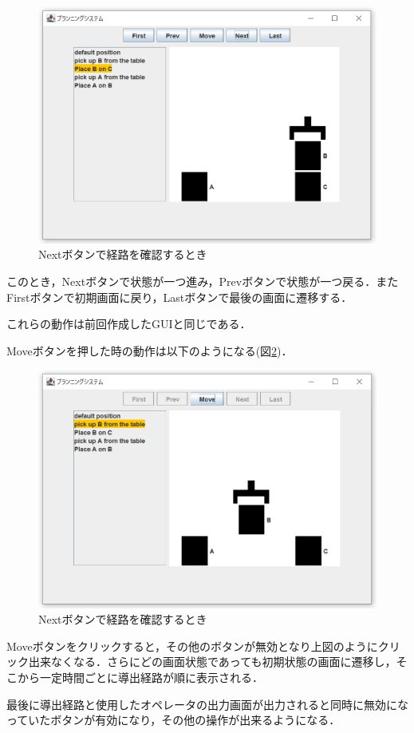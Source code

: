 \documentclass[12pt]{jarticle}
\begin{document}
\begin{figure}[htbp]
  \begin{center}
    \includegraphics[scale=0.8]{images/Normal.PNG}
    \caption{Nextボタンで経路を確認するとき}
    \label{fig:Normal}
  \end{center}
\end{figure}
このとき，Nextボタンで状態が一つ進み，Prevボタンで状態が一つ戻る．またFirstボタンで初期画面に戻り，Lastボタンで最後の画面に遷移する．\par
これらの動作は前回作成したGUIと同じである．\\

\clearpage

Moveボタンを押した時の動作は以下のようになる(図\ref{fig:Move})．\\

\begin{figure}[htbp]
  \begin{center}
    \includegraphics[scale=0.8]{images/Move.PNG}
    \caption{Nextボタンで経路を確認するとき}
    \label{fig:Move}
  \end{center}
\end{figure}
Moveボタンをクリックすると，その他のボタンが無効となり上図のようにクリック出来なくなる．さらにどの画面状態であっても初期状態の画面に遷移し，そこから一定時間ごとに導出経路が順に表示される．\par
最後に導出経路と使用したオペレータの出力画面が出力されると同時に無効になっていたボタンが有効になり，その他の操作が出来るようになる．
\end{document}
